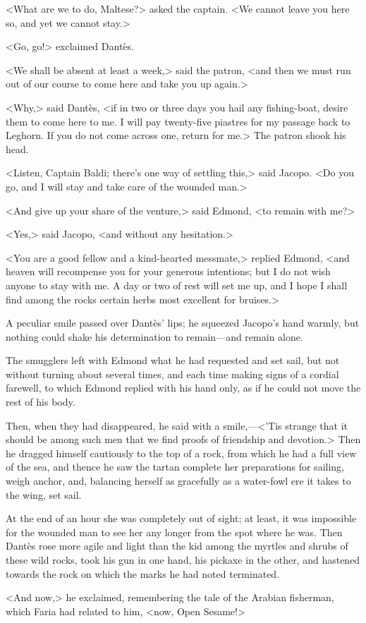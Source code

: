  <What are we to do, Maltese?> asked the captain. <We cannot leave you here so, and yet we cannot stay.> 

 <Go, go!> exclaimed Dantès. 

 <We shall be absent at least a week,> said the patron, <and then we must run out of our course to come here and take you up again.> 

 <Why,> said Dantès, <if in two or three days you hail any fishing-boat, desire them to come here to me. I will pay twenty-five piastres for my passage back to Leghorn. If you do not come across one, return for me.> The patron shook his head. 

 <Listen, Captain Baldi; there's one way of settling this,> said Jacopo. <Do you go, and I will stay and take care of the wounded man.> 

 <And give up your share of the venture,> said Edmond, <to remain with me?> 

 <Yes,> said Jacopo, <and without any hesitation.> 

 <You are a good fellow and a kind-hearted messmate,> replied Edmond, <and heaven will recompense you for your generous intentions; but I do not wish anyone to stay with me. A day or two of rest will set me up, and I hope I shall find among the rocks certain herbs most excellent for bruises.> 

 A peculiar smile passed over Dantès' lips; he squeezed Jacopo's hand warmly, but nothing could shake his determination to remain—and remain alone. 

 The smugglers left with Edmond what he had requested and set sail, but not without turning about several times, and each time making signs of a cordial farewell, to which Edmond replied with his hand only, as if he could not move the rest of his body. 

 Then, when they had disappeared, he said with a smile,—<'Tis strange that it should be among such men that we find proofs of friendship and devotion.> Then he dragged himself cautiously to the top of a rock, from which he had a full view of the sea, and thence he saw the tartan complete her preparations for sailing, weigh anchor, and, balancing herself as gracefully as a water-fowl ere it takes to the wing, set sail. 

 At the end of an hour she was completely out of sight; at least, it was impossible for the wounded man to see her any longer from the spot where he was. Then Dantès rose more agile and light than the kid among the myrtles and shrubs of these wild rocks, took his gun in one hand, his pickaxe in the other, and hastened towards the rock on which the marks he had noted terminated. 

 <And now,> he exclaimed, remembering the tale of the Arabian fisherman, which Faria had related to him, <now, Open Sesame!> 